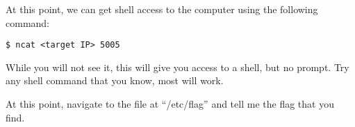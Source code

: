 			At this point, we can get shell access to the computer using the following command:
			\begin{lstlisting}[style=CLI]
				$ ncat <target IP> 5005
			\end{lstlisting}
			While you will not see it, this will give you access to a shell, but no prompt.
			Try any shell command that you know, most will work.

			At this point, navigate to the file at ``/etc/flag'' and tell me the flag that you find.

